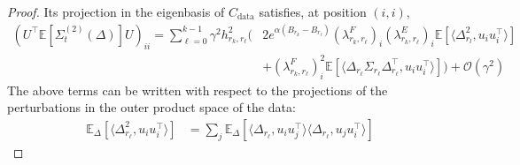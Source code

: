\documentclass[11pt]{article}
\newcommand{\eqdef}{\coloneqq}
\newcommand{\EE}{\mathbb{E}}
\begin{document}
\begin{proof}
Its projection in the eigenbasis of $C_{\mathrm{data}}$ satisfies, at position $(i,i)$,
\begin{equation*}
\begin{split}
\left(U^\top \EE \left[ \Sigma^{(2)}_{t}(\Delta) \right] U \right)_{ii} =  \sum_{\ell=0}^{k-1} \gamma^2 h_{r_k,r_{\ell}}^2 \bigg( &2  e^{\alpha(B_{r_k}- B_{r_\ell})}(\lambda^F_{r_k,r_{\ell}})_i  (\lambda^E_{r_k,r_{\ell}})_i \EE[\langle \Delta_{r_l}^2, u_i u_i^\top \rangle ] \\ &+  (\lambda^F_{r_k,r_{\ell}})^2_i  \EE[\langle \Delta_{r_\ell}  \Sigma_{r_\ell}  \Delta_{r_\ell}^\top, u_i u_i^\top \rangle ]   \biggr) + \mathcal{O}(\gamma^2) %
\end{split}
\end{equation*}
The above terms can be written with respect to the projections of the perturbations in the outer product space of the data:
\begin{align*}
\EE_{\Delta}[\langle \Delta_{r_\ell}^2, u_i u_i^\top \rangle ] &= \sum_j \EE_{\Delta}\left[\langle \Delta_{r_\ell}, u_i u_j^\top \rangle \langle \Delta_{r_\ell}, u_j u_i^\top \rangle \right] %

\end{align*}
\end{proof}
\end{document}

